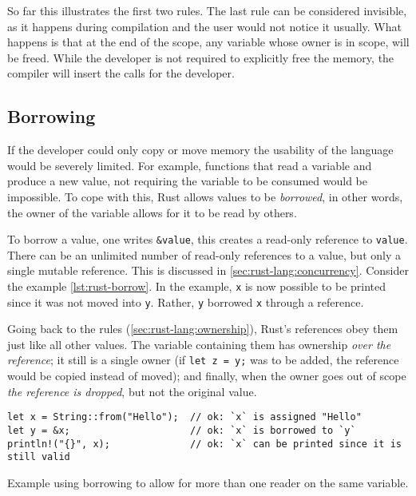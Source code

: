 So far this illustrates the first two rules. The last rule can be considered invisible,
as it happens during compilation and the user would not notice it usually.
What happens is that at the end of the scope, any variable whose owner is in scope, will be freed.
While the developer is not required to explicitly free the memory, the compiler will insert the calls for the developer.

\subsection{Borrowing}\label{sec:rust-lang:borrowing}

If the developer could only copy or move memory the usability of the language would be severely limited.
For example, functions that read a variable and produce a new value,
not requiring the variable to be consumed would be impossible.
To cope with this, Rust allows values to be \emph{borrowed}, in other words,
the owner of the variable allows for it to be read by others.

To borrow a value, one writes \texttt{\&value}, this creates a read-only reference to \texttt{value}.
There can be an unlimited number of read-only references to a value, but only a single mutable reference.
This is discussed in \autoref{sec:rust-lang:concurrency}. Consider the example \autoref{lst:rust-borrow}.
In the example, \texttt{x} is now possible to be printed since it was not moved into \texttt{y}.
Rather, \texttt{y} borrowed \texttt{x} through a reference.

Going back to the rules (\autoref{sec:rust-lang:ownership}), Rust's references obey them just like all other values.
The variable containing them has ownership \emph{over the reference}; it still is a single owner
(if \texttt{let z = y;} was to be added, the reference would be copied instead of moved);
and finally, when the owner goes out of scope \emph{the reference is dropped}, but not the original value.

\begin{listing}
    \begin{verbatim}
let x = String::from("Hello");  // ok: `x` is assigned "Hello"
let y = &x;                     // ok: `x` is borrowed to `y`
println!("{}", x);              // ok: `x` can be printed since it is still valid
    \end{verbatim}
    \caption{Example using borrowing to allow for more than one reader on the same variable.}
    \label{lst:rust-borrow}
\end{listing}

